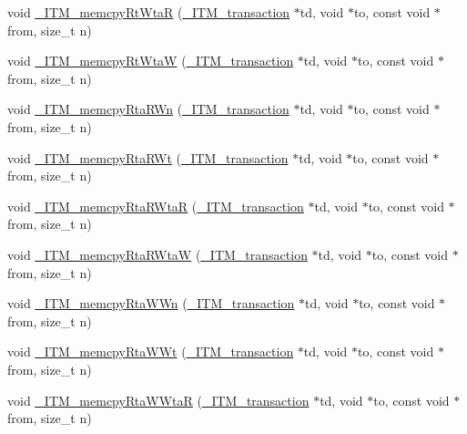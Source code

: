 \begin{DoxyCompactItemize}
\item 
void \hyperlink{libitm-5_813_0014_8cpp_a42a0d979ff23bb05b90f1b29c542ce0f}{\-\_\-\-I\-T\-M\-\_\-memcpy\-Rt\-Wta\-R} (\hyperlink{libitm_8h_a65d3a93d285fdbde408558d6b431abc8}{\-\_\-\-I\-T\-M\-\_\-transaction} $\ast$td, void $\ast$to, const void $\ast$from, size\-\_\-t n)
\item 
void \hyperlink{libitm-5_813_0014_8cpp_a1dad394b331ec5ddd775c360fd1f9000}{\-\_\-\-I\-T\-M\-\_\-memcpy\-Rt\-Wta\-W} (\hyperlink{libitm_8h_a65d3a93d285fdbde408558d6b431abc8}{\-\_\-\-I\-T\-M\-\_\-transaction} $\ast$td, void $\ast$to, const void $\ast$from, size\-\_\-t n)
\item 
void \hyperlink{libitm-5_813_0014_8cpp_a0c2b2b487a894cecf01b4fdac9fa19ff}{\-\_\-\-I\-T\-M\-\_\-memcpy\-Rta\-R\-Wn} (\hyperlink{libitm_8h_a65d3a93d285fdbde408558d6b431abc8}{\-\_\-\-I\-T\-M\-\_\-transaction} $\ast$td, void $\ast$to, const void $\ast$from, size\-\_\-t n)
\item 
void \hyperlink{libitm-5_813_0014_8cpp_a3d396e4d94aa7226c2fa5cab2309ba58}{\-\_\-\-I\-T\-M\-\_\-memcpy\-Rta\-R\-Wt} (\hyperlink{libitm_8h_a65d3a93d285fdbde408558d6b431abc8}{\-\_\-\-I\-T\-M\-\_\-transaction} $\ast$td, void $\ast$to, const void $\ast$from, size\-\_\-t n)
\item 
void \hyperlink{libitm-5_813_0014_8cpp_a5cbf5894ac840f0321c5629eb70f126d}{\-\_\-\-I\-T\-M\-\_\-memcpy\-Rta\-R\-Wta\-R} (\hyperlink{libitm_8h_a65d3a93d285fdbde408558d6b431abc8}{\-\_\-\-I\-T\-M\-\_\-transaction} $\ast$td, void $\ast$to, const void $\ast$from, size\-\_\-t n)
\item 
void \hyperlink{libitm-5_813_0014_8cpp_a309a66b77656078766a1466e01f01f7e}{\-\_\-\-I\-T\-M\-\_\-memcpy\-Rta\-R\-Wta\-W} (\hyperlink{libitm_8h_a65d3a93d285fdbde408558d6b431abc8}{\-\_\-\-I\-T\-M\-\_\-transaction} $\ast$td, void $\ast$to, const void $\ast$from, size\-\_\-t n)
\item 
void \hyperlink{libitm-5_813_0014_8cpp_a9fd986ec251b625445d9e38a2e5ecc60}{\-\_\-\-I\-T\-M\-\_\-memcpy\-Rta\-W\-Wn} (\hyperlink{libitm_8h_a65d3a93d285fdbde408558d6b431abc8}{\-\_\-\-I\-T\-M\-\_\-transaction} $\ast$td, void $\ast$to, const void $\ast$from, size\-\_\-t n)
\item 
void \hyperlink{libitm-5_813_0014_8cpp_a037e1ef8a72c7040dbf9d45e17d37674}{\-\_\-\-I\-T\-M\-\_\-memcpy\-Rta\-W\-Wt} (\hyperlink{libitm_8h_a65d3a93d285fdbde408558d6b431abc8}{\-\_\-\-I\-T\-M\-\_\-transaction} $\ast$td, void $\ast$to, const void $\ast$from, size\-\_\-t n)
\item 
void \hyperlink{libitm-5_813_0014_8cpp_afb9972f25cc9363a0931bddcb694f528}{\-\_\-\-I\-T\-M\-\_\-memcpy\-Rta\-W\-Wta\-R} (\hyperlink{libitm_8h_a65d3a93d285fdbde408558d6b431abc8}{\-\_\-\-I\-T\-M\-\_\-transaction} $\ast$td, void $\ast$to, const void $\ast$from, size\-\_\-t n)

\end{DoxyCompactItemize}
